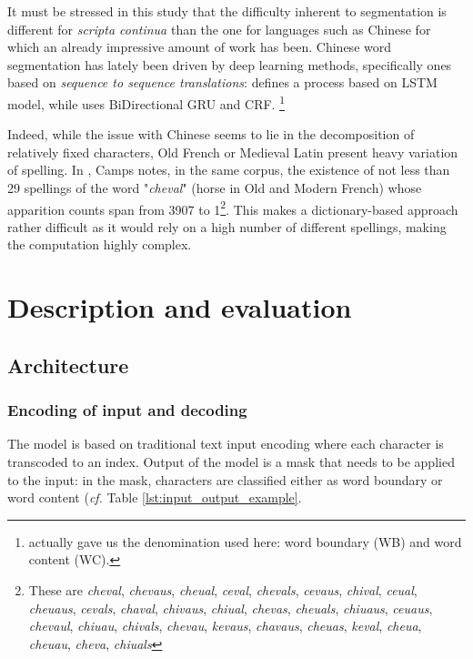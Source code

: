 \documentclass{jdmdh}
\begin{document}
It must be stressed in this study that the difficulty inherent to segmentation is different for \textit{scripta continua} than the one for languages such as Chinese for which an already impressive amount of work has been. Chinese word segmentation has lately been driven by deep learning methods, specifically ones based on \textit{sequence to sequence translations}: \citet{chen2015long} defines a process based on LSTM model, while \citet{yu2019learning} uses BiDirectional GRU and CRF. \footnote{\citet{huang2019realistic} actually gave us the denomination used here: word boundary (WB) and word content (WC).}

Indeed, while the issue with Chinese seems to lie in the decomposition of relatively fixed characters, Old French or Medieval Latin present heavy variation of spelling. In \citet{camps_pandora}, Camps notes, in the same corpus, the existence of not less than 29 spellings of the word "\textit{cheval}" (horse in Old and Modern French) whose apparition counts span from 3907 to 1\footnote{These are \textit{cheval}, \textit{chevaus}, \textit{cheual}, \textit{ceval}, \textit{chevals}, \textit{cevaus}, \textit{chival}, \textit{ceual}, \textit{cheuaus}, \textit{cevals}, \textit{chaval}, \textit{chivaus}, \textit{chiual}, \textit{chevas}, \textit{cheuals}, \textit{chiuaus}, \textit{ceuaus}, \textit{chevaul}, \textit{chiuau}, \textit{chivals}, \textit{chevau}, \textit{kevaus}, \textit{chavaus}, \textit{cheuas}, \textit{keval}, \textit{cheua}, \textit{cheuau}, \textit{cheva}, \textit{chiuals}}. This  makes a dictionary-based approach rather difficult as it would rely on a high number of different spellings, making the computation highly complex.

\section{Description and evaluation}

\subsection{Architecture}

\subsubsection{Encoding of input and decoding}

The model is based on traditional text input encoding where each character is transcoded to an index. Output of the model is a mask that needs to be applied to the input: in the mask, characters are classified either as word boundary or word content (\textit{cf.} Table \ref{lst:input_output_example}.
\end{document}

